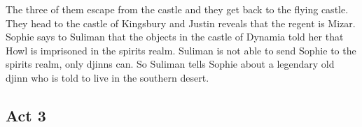 The three of them escape from the castle and they get back to the flying castle. They head to the castle of Kingsbury and Justin reveals that the regent is Mizar. Sophie says to Suliman that the objects in the castle of Dynamia told her that Howl is imprisoned in the spirits realm. Suliman is not able to send Sophie to the spirits realm, only djinns can. So Suliman tells Sophie about a legendary old djinn who is told to live in the southern desert.




\subsection*{Act 3}
